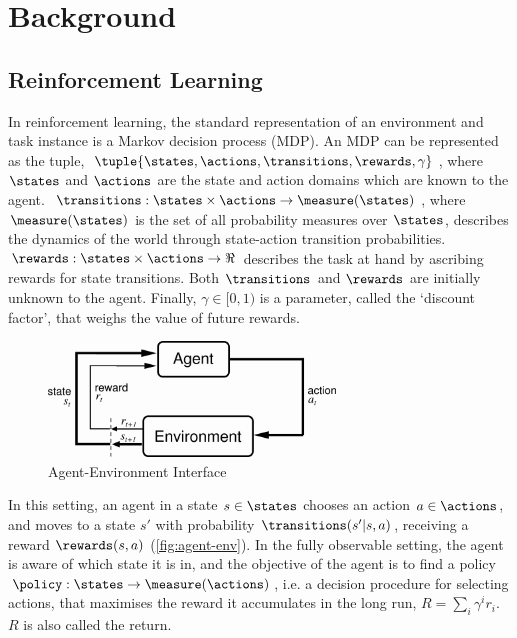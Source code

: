 \chapter{Background}
\label{chap:background}

\section{Reinforcement Learning}
\label{sec:background:rl}

In reinforcement learning, the standard representation of an
environment and task instance is a Markov decision process (MDP). An
MDP can be represented as the tuple, $\tuple{ \states, \actions,
\transitions, \rewards, \gamma }$, where $\states$ and $\actions$ are
the state and action domains which are known to the agent.
$\transitions: \states \times \actions \to \measure(\states)$, where
$\measure(\states)$ is the set of all probability measures over
$\states$, describes the dynamics of the world through state-action
transition probabilities. $\rewards: \states \times \actions \to \Re$
describes the task at hand by ascribing rewards for state transitions.
Both $\transitions$ and $\rewards$ are initially unknown to the agent.
Finally, $\gamma \in [0,1)$ is a parameter, called the `discount
factor', that weighs the value of future rewards. 

\begin{figure}[ht]
  \centering
  \includegraphics[width=3in]{figures/agent-environment.png}
  \caption{Agent-Environment Interface}
  \label{fig:agent-env}
\end{figure}

In this setting, an agent in a state $s \in \states$ chooses an action
$a \in \actions$, and moves to a state $s'$ with probability
$\transitions(s'|s,a)$, receiving a reward $\rewards(s,a)$
(\autoref{fig:agent-env}). In the fully observable setting, the agent is
aware of which state it is in, and the objective of the agent is to find
a policy $\policy: \states \to \measure( \actions )$, i.e. a decision
procedure for selecting actions, that maximises the reward it
accumulates in the long run, $R = \sum_{i} \gamma^i r_i$. $R$ is also
called the return. 

